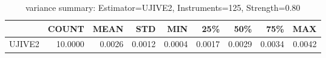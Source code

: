 \begin{table}[ht]
\centering
\caption{variance summary: Estimator=UJIVE2, Instruments=125, Strength=0.80}
\begin{tabular}{lrrrrrrrr}
\toprule
 & COUNT & MEAN & STD & MIN & 25\% & 50\% & 75\% & MAX \\
\midrule
UJIVE2 & 10.0000 & 0.0026 & 0.0012 & 0.0004 & 0.0017 & 0.0029 & 0.0034 & 0.0042 \\
\bottomrule
\end{tabular}
\end{table}
